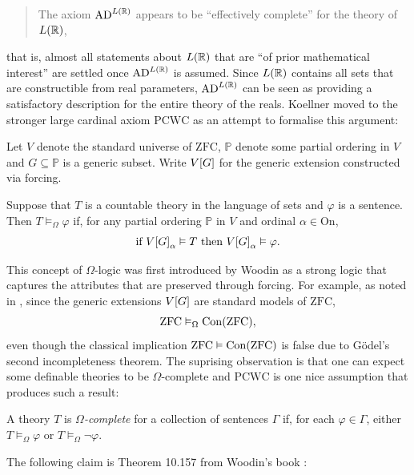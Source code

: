 \documentclass[12pt]{article}
\theoremstyle{plain}
\theoremstyle{definition}
\newcommand{\ZFC}{\mathrm{ZFC}}
\newcommand{\On}{\mathrm{On}}
\newcommand{\PCWC}{\mathrm{PCWC}}
\newcommand{\AD}{\mathrm{AD}}
\DeclareMathOperator{\Con}{Con}
\begin{document}
\begin{quote}
	The axiom $\AD^{L\mleft(\mathbb{R}\mright)}$ appears to be ``effectively complete'' for the theory of $L\mleft(\mathbb{R}\mright)$,
\end{quote}

that is, almost all statements about $L\mleft(\mathbb{R}\mright)$ that are ``of prior mathematical interest'' are settled once $\AD^{L\mleft(\mathbb{R}\mright)}$ is assumed. Since $L\mleft(\mathbb{R}\mright)$ contains all sets that are constructible from real parameters, $\AD^{L\mleft(\mathbb{R}\mright)}$ can be seen as providing a satisfactory description for the entire theory of the reals. Koellner moved to the stronger large cardinal axiom $\PCWC$ as an attempt to formalise this argument:

Let $V$ denote the standard universe of $\ZFC$, $\mathbb{P}$ denote some partial ordering in $V$ and $G \subseteq \mathbb{P}$ is a generic subset. Write $V\mleft[G\mright]$ for the generic extension constructed via forcing.

\begin{definition}
	Suppose that $T$ is a countable theory in the language of sets and $\varphi$ is a sentence. Then $T \vDash_\Omega \varphi$ if, for any partial ordering $\mathbb{P}$ in $V$ and ordinal $\alpha \in \On$,
	\[\text{if $V\mleft[G\mright]_\alpha \vDash T$ then $V\mleft[G\mright]_\alpha \vDash \varphi$.}\]
\end{definition}

This concept of $\Omega$-logic was first introduced by Woodin as a strong logic that captures the attributes that are preserved through forcing. For example, as noted in \cite{omega-logic-primer}, since the generic extensions $V\mleft[G\mright]$ are standard models of $\ZFC$,
\[\ZFC \vDash_\Omega \Con\mleft(\ZFC\mright),\]
even though the classical implication $\ZFC \vDash \Con\mleft(\ZFC\mright)$ is false due to G\"odel's second incompleteness theorem. The suprising observation is that one can expect some definable theories to be $\Omega$-complete and $\PCWC$ is one nice assumption that produces such a result:

\begin{definition}
	A theory $T$ is \emph{$\Omega$-complete} for a collection of sentences $\Gamma$ if, for each $\varphi \in \Gamma$, either $T \vDash_\Omega \varphi$ or $T \vDash_\Omega \neg \varphi$.
\end{definition}

The following claim is Theorem 10.157 from Woodin's book \cite{woodin-de-gruyter}:
\end{document}
